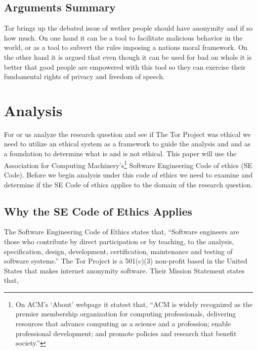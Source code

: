 \documentclass[11pt]{article}
\begin{document}
\begin{multicols}{2}
\subsection{Arguments Summary}

Tor brings up the debated issue of wether people should have anonymity and if so
how much. On one hand it can be a tool to facilitate malicious behavior in the
world, or as a tool to subvert the rules imposing a nations moral framework. On
the other hand it is argued that even though it can be used for bad on whole it
is  better that good people are empowered with this tool so they can exercise
their fundamental rights of privacy and freedom of speech.

\section{Analysis}

For or us analyze the research question and see if The Tor
Project was ethical we need to utilize an ethical system as a framework
to guide the analysis and and as a foundation to determine what is and is
not ethical. This paper will use the Association for Computing
Machinery's\footnote{On ACM's `About' webpage it statest that, ``ACM is widely recognized as the premier membership
  organization for computing professionals, delivering resources that advance
  computing as a science and a profession; enable professional development; and
promote policies and research that benefit society.''\cite{ACM:About}}
Software Engineering Code of ethics (SE Code). Before we begin analysis under this code of
ethics we need to examine and determine if the SE Code of ethics applies to
the domain of the research question.

\subsection{Why the SE Code of Ethics Applies} 

The Software Engineering Code of Ethics states that, ``Software engineers are
those who contribute by direct participation or by teaching, to the analysis,
specification, design, development, certification, maintenance and testing of
software systems.'' \cite{SE:CodeOfEthics} The Tor Project is a 501(c)(3)
non-profit based in the United States that makes internet anonymity
software.\cite{Tor:FAQ, Tor:CorePeople} Their Mission Statement states that,


\end{multicols}
\end{document}
